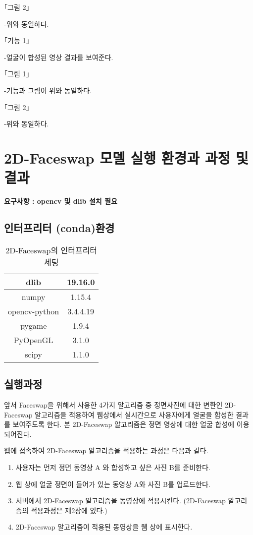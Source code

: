 \documentclass{oblivoir}
\begin{document}
｢그림 2｣

-위와 동일하다.

\begin{figure}[h!]
\centering
\end{figure}
｢기능 1｣

-얼굴이 합성된 영상 결과를 보여준다.

｢그림 1｣

-기능과 그림이 위와 동일하다.

｢그림 2｣

-위와 동일하다.

\section{ 2D-Faceswap 모델 실행 환경과 과정 및 결과}

\textbf{요구사항 :  opencv 및 dlib 설치 필요}

\subsection{인터프리터 (conda)환경}

\begin{table}[h!]
\centering
\begin{tabular}{|c|c|}
    \hline\hline
    dlib & 19.16.0 \\ \hline
    numpy & 1.15.4 \\             \hline
    opencv-python & 3.4.4.19\\             \hline
    pygame & 1.9.4 \\            \hline
    PyOpenGL & 3.1.0 \\            \hline
    scipy  &  1.1.0\\
    \hline\hline
\end{tabular}
\caption{2D-Faceswap의 인터프리터 세팅  }
\end{table}

\subsection{실행과정} 

앞서 Faceswap을 위해서 사용한 4가지 알고리즘 중 정면사진에 대한 변환인 2D-Faceswap 알고리즘을 적용하여 웹상에서 실시간으로 사용자에게 얼굴을 합성한 결과를 보여주도록 한다. 본 2D-Faceswap 알고리즘은 정면 영상에 대한 얼굴 합성에 이용되어진다. 

웹에 접속하여 2D-Faceswap 알고리즘을 적용하는 과정은 다음과 같다. 
\begin{enumerate}
    \item  사용자는 먼저 정면 동영상 A 와 합성하고 싶은 사진 B를 준비한다.
    \item 웹 상에 얼굴 정면이 들어가 있는 동영상 A와 사진 B를 업로드한다.
    \item 서버에서 2D-Faceswap 알고리즘을 동영상에 적용시킨다. (2D-Faceswap 알고리즘의 적용과정은 제2장에 있다.)
    \item 2D-Faceswap 알고리즘이 적용된 동영상을 웹 상에 표시한다.
\end{enumerate}
\end{document}

